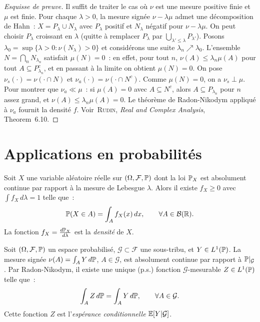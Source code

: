\begin{proof}[Esquisse de preuve]
Il suffit de traiter le cas o\`u $\nu$ est une mesure positive finie et $\mu$ est finie.
Pour chaque $\lambda > 0$, la mesure sign\'ee $\nu - \lambda\mu$ admet une
d\'ecomposition de Hahn~: $X = P_\lambda \cup N_\lambda$ avec $P_\lambda$ positif et
$N_\lambda$ n\'egatif pour $\nu - \lambda\mu$. On peut choisir $P_\lambda$ croissant
en $\lambda$ (quitte \`a remplacer $P_\lambda$ par $\bigcup_{\lambda' \leq \lambda} P_{\lambda'}$).
Posons $\lambda_0 = \sup\{\lambda > 0 : \nu(N_\lambda) > 0\}$ et consid\'erons une suite
$\lambda_n \nearrow \lambda_0$. L'ensemble $N = \bigcap_{n} N_{\lambda_n}$ satisfait
$\mu(N) = 0$~: en effet, pour tout $n$, $\nu(A) \leq \lambda_n \mu(A)$ pour tout
$A \subseteq P_{\lambda_n}^c$, et en passant \`a la limite on obtient $\mu(N) = 0$.
On pose $\nu_s(\cdot) = \nu(\cdot \cap N)$ et $\nu_a(\cdot) = \nu(\cdot \cap N^c)$.
Comme $\mu(N) = 0$, on a $\nu_s \perp \mu$. Pour montrer que $\nu_a \ll \mu$~: si
$\mu(A) = 0$ avec $A \subseteq N^c$, alors $A \subseteq P_{\lambda_n}$ pour $n$ assez
grand, et $\nu(A) \leq \lambda_n \mu(A) = 0$. Le th\'eor\`eme de Radon-Nikodym
appliqu\'e \`a $\nu_a$ fournit la densit\'e $f$.
Voir~\textsc{Rudin}, \emph{Real and Complex Analysis}, Theorem~6.10.
\end{proof}

\section{Applications en probabilit\'es}

\begin{exemple}
Soit $X$ une variable al\'eatoire r\'eelle sur $(\Omega, \mathcal{F}, \mathbb{P})$ dont la
loi $\mathbb{P}_X$ est absolument continue par rapport \`a la mesure de Lebesgue $\lambda$.
Alors il existe $f_X \geq 0$ avec $\int f_X\, d\lambda = 1$ telle que~:
\[
    \mathbb{P}(X \in A) = \int_A f_X(x)\, dx, \qquad \forall A \in \mathcal{B}(\mathbb{R}).
\]
La fonction $f_X = \frac{d\mathbb{P}_X}{d\lambda}$ est la \emph{densit\'e} de $X$.
\end{exemple}

\begin{exemple}
Soit $(\Omega, \mathcal{F}, \mathbb{P})$ un espace probabilis\'e, $\mathcal{G} \subset \mathcal{F}$
une sous-tribu, et $Y \in L^1(\mathbb{P})$. La mesure sign\'ee
$\nu(A) = \int_A Y\, d\mathbb{P}$, $A \in \mathcal{G}$, est absolument continue par rapport
\`a $\mathbb{P}|_{\mathcal{G}}$. Par Radon-Nikodym, il existe une unique (p.s.) fonction
$\mathcal{G}$-mesurable $Z \in L^1(\mathbb{P})$ telle que~:
\[
    \int_A Z\, d\mathbb{P} = \int_A Y\, d\mathbb{P}, \qquad \forall A \in \mathcal{G}.
\]
Cette fonction $Z$ est l'\emph{esp\'erance conditionnelle} $\mathbb{E}[Y | \mathcal{G}]$.
\end{exemple}

